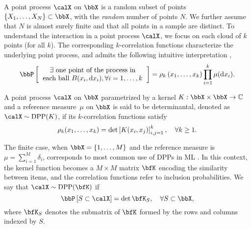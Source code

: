 \documentclass[twoside,11pt]{article}
\begin{document}
    A point process $\calX$ on $\bbX$ is a random subset of points $\lrcb{X_1, \dots, X_N} \subset \bbX$, with the \emph{random} number of points $N$. We further assume that $N$ is almost surely finite and that all points in a sample are distinct.
    To understand the interaction in a point process $\calX$, we focus on each cloud of $k$ points (for all $k$).
    The corresponding $k$-correlation functions characterize the underlying point process, and admits the following intuitive interpretation \citep[Section 4]{MoWa04},
    \begin{equation}
    	\Proba{
    		\begin{tabular}{c}
    			$\exists$ one point of the process in\\
    			each ball $B(x_i, \diff x_i), \forall i=1,\dots, k $
    		\end{tabular}
    	}
    	= \rho_k\lrp{x_1,\dots,x_k}
    		\prod_{i=1}^k \mu(\diff x_i).
    \end{equation}


		\noindent
  	A point process $\calX$ on $\bbX$ parametrized by a kernel $K:\bbX\times \bbX\rightarrow \mathbb{C}$ and a reference measure~$\mu$ on $\bbX$ is said to be determinantal, denoted as $\calX\sim\DPP(K)$, if its $k$-correlation functions satisfy
	  \begin{equation}
	  \label{eq:k-correlation_function_DPP}
	    \rho_k(x_1,\dots,x_k)
	      = \det \left[ K(x_i, x_j) \right]_{i,j=1}^k,
	    \quad \forall k\geq 1.
	  \end{equation}

		\noindent
		The finite case, when $\bbX = \lrcb{1,\dots,M}$ and the reference measure is $\mu=\sum_{i=1}^M \delta_i$, corresponds to most common use of DPPs in ML \citep{KuTa12}.
		In this context, the kernel function becomes a $M\times M$ matrix $\bfK$ encoding the similarity between items, and the correlation functions refer to inclusion probabilities.
		We say that $\calX\sim \DPP(\bfK)$ if
	  \begin{equation}
	  \label{eq:inclusion_proba_finite}
	    \Proba{S \subset \calX} = \det \bfK_S,
	      \quad\forall S\subset \bbX,
	  \end{equation}
		\noindent
    where $\bfK_S$ denotes the submatrix of $\bfK$ formed by the rows and columns indexed by $S$.
\end{document}
